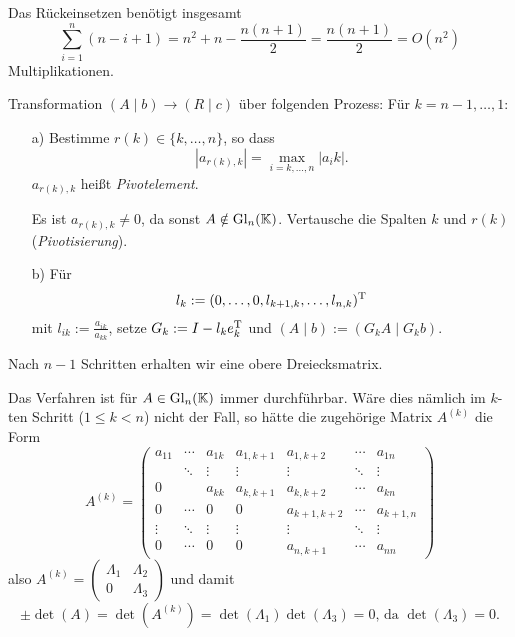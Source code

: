 Das Rückeinsetzen benötigt insgesamt \[
  \sum_{i=1}^n (n - i + 1) = n^2 + n - \frac{n(n+1)}{2} = \frac{n(n+1)}{2}
    = O(n^2)
\] Multiplikationen.

Transformation $(A \mid b) \to (R \mid c)$ über folgenden Prozess:
Für $k=n-1, \ldots, 1$:
\begin{itemize}
  \item[a)] Bestimme $r(k) \in \{k, \ldots, n\}$, so dass
    $$|a_{r(k),k}| = \max_{i=k,\ldots,n}|a_ik|.$$
    $a_{r(k),k}$ heißt \emph{Pivotelement}.

    Es ist $a_{r(k),k} \ne 0$, da sonst $A \notin \mathrm{Gl}_n(\mathbb K)$.
    Vertausche die Spalten $k$ und $r(k)$ (\emph{Pivotisierung}).

    \item[b)] Für $$l_k := (0, \ldots, 0, l_{k+1,k}, \ldots, l_{n,k})^\mathrm T$$
    mit $l_{ik} := \frac{a_{ik}}{a_{kk}}$, setze $G_k := I - l_ke_k^\mathrm T$
    und $(A \mid b) := (G_k A \mid G_k b)$.
\end{itemize}


Nach $n-1$ Schritten erhalten wir eine obere Dreiecksmatrix.

\begin{Bemerkung}
Das Verfahren ist für $A \in \mathrm{Gl}_n(\mathbb K)$ immer durchführbar.
Wäre dies nämlich im $k$-ten Schritt ($1 \le k < n$) nicht der Fall, so
hätte die zugehörige Matrix $A^{(k)}$ die Form \[
  A^{(k)} = \left( \begin{array}{ccc|cccc}
  a_{11} & \cdots & a_{1k} & a_{1,k+1} & a_{1,k+2} & \cdots & a_{1n} \\
  & \ddots & \vdots & \vdots & \vdots & \ddots & \vdots \\
  0 & & a_{kk} & a_{k,k+1} & a_{k,k+2} & \cdots & a_{kn} \\ \hline
  0 & \cdots & 0 & 0 & a_{k+1,k+2} & \cdots & a_{k+1,n} \\
  \vdots & \ddots & \vdots & \vdots & \vdots & \ddots &  \vdots \\
  0 & \cdots & 0 & 0 & a_{n,k+1} & \cdots & a_{nn}
  \end{array} \right)
\] also \(
  A^{(k)} = \left( \begin{array}{c|c} \Lambda_1 & \Lambda_2 \\\hline 0 & \Lambda_3 \end{array} \right)
\) und damit
$$\pm \det(A) = \det(A^{(k)}) = \det(\Lambda_1) \det(\Lambda_3) = 0\text{, da }\det (\Lambda_3) = 0.$$
\end{Bemerkung}

